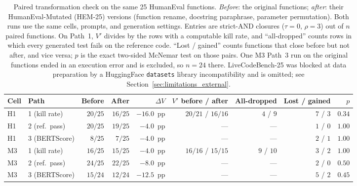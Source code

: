 \begin{table}[!htbp]
  \centering
  \footnotesize
  \caption{Paired transformation check on the same 25 HumanEval functions.
    \emph{Before}: the original functions; \emph{after}: their
    HumanEval-Mutated (HEM-25) versions (function rename, docstring
    paraphrase, parameter permutation). Both runs use the same cells,
    prompts, and generation settings. Entries are strict-AND closures
    ($\tau = 0$, $\rho = 3$) out of $n$ paired functions. On Path~1,
    $V'$ divides by the rows with a computable kill rate, and
    ``all-dropped'' counts rows in which every generated test fails on
    the reference code. ``Lost / gained'' counts functions that close
    before but not after, and vice versa; $p$ is the exact two-sided
    McNemar test on those pairs. One M3 Path~3 run on the original
    functions ended in an execution error and is excluded, so $n = 24$
    there. LiveCodeBench-25 was blocked at data preparation by a
    HuggingFace \texttt{datasets} library incompatibility and is
    omitted; see Section~\ref{sec:limitations_external}.}
  \label{tab:holdout_sensitivity}
  \begin{tabular}{@{}llrrrrrrr@{}}
    \toprule
    Cell & Path & Before & After & $\Delta V$ & $V'$ before / after & All-dropped & Lost / gained & $p$ \\
    \midrule
    H1 & 1 (kill rate)  & $20/25$ & $16/25$ & $-16.0$~pp & $20/21$ / $16/16$ & $4$ / $9$  & $7$ / $3$ & $0.34$ \\
    H1 & 2 (ref.\ pass) & $20/25$ & $19/25$ & $-4.0$~pp  & ---               & ---        & $1$ / $0$ & $1.00$ \\
    H1 & 3 (BERTScore)  & $8/25$  & $7/25$  & $-4.0$~pp  & ---               & ---        & $2$ / $1$ & $1.00$ \\
    \midrule
    M3 & 1 (kill rate)  & $16/25$ & $15/25$ & $-4.0$~pp  & $16/16$ / $15/15$ & $9$ / $10$ & $3$ / $2$ & $1.00$ \\
    M3 & 2 (ref.\ pass) & $24/25$ & $22/25$ & $-8.0$~pp  & ---               & ---        & $2$ / $0$ & $0.50$ \\
    M3 & 3 (BERTScore)  & $15/24$ & $12/24$ & $-12.5$~pp & ---               & ---        & $5$ / $2$ & $0.45$ \\
    \bottomrule
  \end{tabular}
\end{table}
